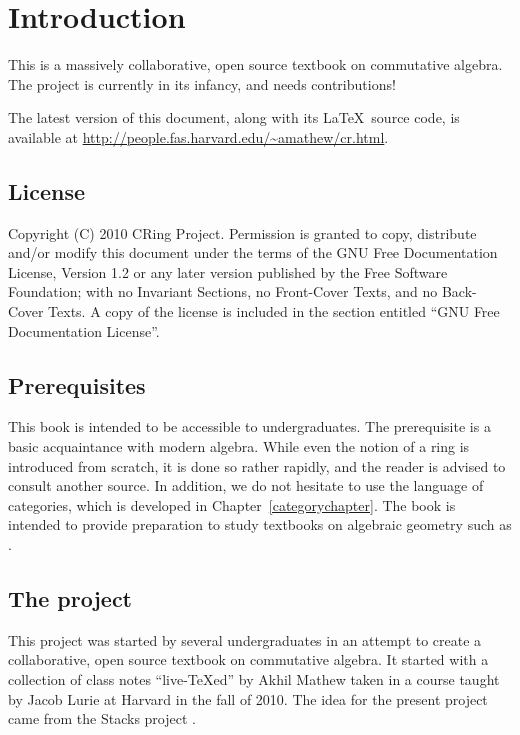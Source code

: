 \nocite{*}

\chapter*{Introduction}

This is a massively collaborative, open source textbook on commutative
algebra. The project is currently in its infancy, and needs contributions!

The latest version of this document, along with its \LaTeX\ source code, is
available at \url{http://people.fas.harvard.edu/~amathew/cr.html}.

\section*{License}

Copyright (C) 2010 CRing Project.  Permission is granted to copy, distribute
and/or modify this document under the terms of the GNU Free Documentation
License, Version 1.2 or any later version published by the Free Software
Foundation; with no Invariant Sections, no Front-Cover Texts, and no
Back-Cover Texts. A copy of the license is included in the section entitled
``GNU Free Documentation License''.

\section*{Prerequisites}

This book is intended to be accessible to undergraduates. The prerequisite is
a basic acquaintance with modern algebra. While even the notion of a ring is
introduced from scratch, it is done so rather rapidly, and the reader is
advised to consult another source. In addition, we do not hesitate to use the
language of categories, which is developed in Chapter~\ref{categorychapter}.
The book is intended to provide preparation to study textbooks on algebraic
geometry such as \cite{Ha77}.

\section*{The project}

This project was started by several undergraduates in an attempt to create
a collaborative, open source textbook on commutative algebra.  It started with
a collection of class notes ``live-\TeX ed'' by Akhil Mathew taken in a course
 taught by Jacob Lurie at Harvard in the fall of 2010. The idea for the
 present project came
from the Stacks project \cite{St10}.

